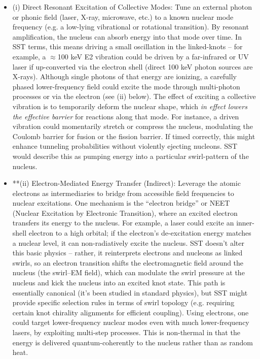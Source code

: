 \documentclass[11pt]{article}
\begin{document}
\begin{itemize}

\item 
(i) Direct Resonant Excitation of Collective Modes: Tune an external photon or phonic field (laser, X-ray, microwave, etc.) to a known nuclear mode frequency (e.g. a low-lying vibrational or rotational transition). By resonant amplification, the nucleus can absorb energy into that mode over time. In SST terms, this means driving a small oscillation in the linked-knots – for example, a $\approx$100 keV E2 vibration could be driven by a far-infrared or UV laser if up-converted via the electron shell (direct 100 keV photon sources are X-rays). Although single photons of that energy are ionizing, a carefully phased lower-frequency field could excite the mode through multi-photon processes or via the electron (see (ii) below). The effect of exciting a collective vibration is to temporarily deform the nuclear shape, which \textit{in effect lowers the effective barrier} for reactions along that mode. For instance, a driven vibration could momentarily stretch or compress the nucleus, modulating the Coulomb barrier for fusion or the fission barrier. If timed correctly, this might enhance tunneling probabilities without violently ejecting nucleons. SST would describe this as pumping energy into a particular swirl-pattern of the nucleus.




\item 
**(ii) Electron-Mediated Energy Transfer (Indirect): Leverage the atomic electrons as intermediaries to bridge from accessible field frequencies to nuclear excitations. One mechanism is the “electron bridge” or NEET (Nuclear Excitation by Electronic Transition), where an excited electron transfers its energy to the nucleus. For example, a laser could excite an inner-shell electron to a high orbital; if the electron’s de-excitation energy matches a nuclear level, it can non-radiatively excite the nucleus. SST doesn’t alter this basic physics – rather, it reinterprets electrons and nucleons as linked swirls, so an electron transition shifts the electromagnetic field around the nucleus (the swirl–EM field), which can modulate the swirl pressure at the nucleus and kick the nucleus into an excited knot state. This path is essentially canonical (it’s been studied in standard physics), but SST might provide specific selection rules in terms of swirl topology (e.g. requiring certain knot chirality alignments for efficient coupling). Using electrons, one could target lower-frequency nuclear modes even with much lower-frequency lasers, by exploiting multi-step processes. This is non-thermal in that the energy is delivered quantum-coherently to the nucleus rather than as random heat.





\end{itemize}
\end{document}
